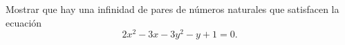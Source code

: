 Mostrar que hay una infinidad de pares de números naturales que satisfacen la ecuación
\[2x^2-3x-3y^2-y+1=0.\]